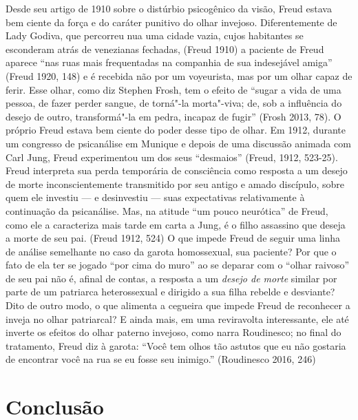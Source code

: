 Desde seu artigo de 1910 sobre o distúrbio psicogênico da visão, Freud
estava bem ciente da força e do caráter punitivo do olhar invejoso.
Diferentemente de Lady Godiva, que percorreu nua uma cidade vazia, cujos
habitantes se esconderam atrás de venezianas fechadas, (Freud 1910) a
paciente de Freud aparece ``nas ruas mais frequentadas na companhia de
sua indesejável amiga'' (Freud 1920, 148) e é recebida não por um
voyeurista, mas por um olhar capaz de ferir. Esse olhar, como diz
Stephen Frosh, tem o efeito de ``sugar a vida de uma pessoa, de fazer
perder sangue, de torná"-la morta"-viva; de, sob a influência do desejo de
outro, transformá"-la em pedra, incapaz de fugir'' (Frosh 2013, 78). O
próprio Freud estava bem ciente do poder desse tipo de olhar. Em 1912,
durante um congresso de psicanálise em Munique e depois de uma discussão
animada com Carl Jung, Freud experimentou um dos seus ``desmaios'' (Freud,
1912, 523-25). Freud interpreta sua perda temporária de consciência como
resposta a um desejo de morte inconscientemente transmitido por seu
antigo e amado discípulo, sobre quem ele investiu --- e desinvestiu ---
suas expectativas relativamente à continuação da psicanálise. Mas, na
atitude ``um pouco neurótica'' de Freud, como ele a caracteriza mais tarde
em carta a Jung, é o filho assassino que deseja a morte de seu pai.
(Freud 1912, 524) O que impede Freud de seguir uma linha de análise
semelhante no caso da garota homossexual, sua paciente? Por que o fato
de ela ter se jogado ``por cima do muro'' ao se deparar com o ``olhar
raivoso'' de seu pai não é, afinal de contas, a resposta a um
\emph{desejo de morte} similar por parte de um patriarca heterossexual e
dirigido a sua filha rebelde e desviante? Dito de outro modo, o que
alimenta a cegueira que impede Freud de reconhecer a inveja no olhar
patriarcal? E ainda mais, em uma reviravolta interessante, ele até
inverte os efeitos do olhar paterno invejoso, como narra Roudinesco; no
final do tratamento, Freud diz à garota: ``Você tem olhos tão astutos
que eu não gostaria de encontrar você na rua se eu fosse seu inimigo.''
(Roudinesco 2016, 246)

\section{Conclusão}

